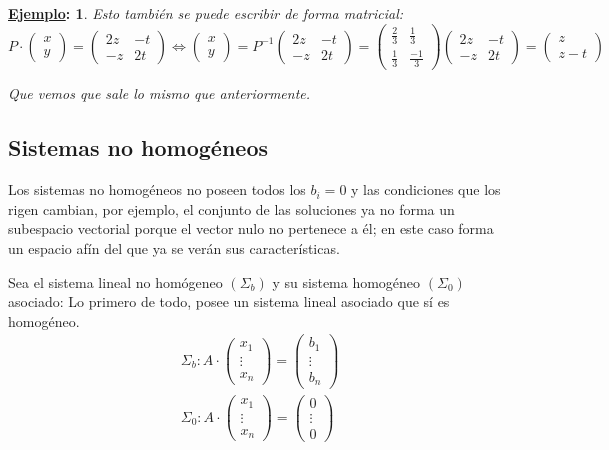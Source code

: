 \documentclass[10pt,a4paper,openright]{book}
\theoremstyle{break}
\newtheorem*{ej}{\underline{Ejemplo}:}
\begin{document}
\begin{ej}
Esto también se puede escribir de forma matricial:
$$P\cdot \begin{pmatrix} x \\ y\end{pmatrix}=\begin{pmatrix} 2z & -t \\ -z & 2t \end{pmatrix}\Leftrightarrow \begin{pmatrix} x \\ y\end{pmatrix}=P^{-1}\begin{pmatrix} 2z & -t \\ -z & 2t \end{pmatrix}= \begin{pmatrix} \frac{2}{3} & \frac{1}{3} \\ \frac{1}{3}& \frac{-1}{3}\end{pmatrix}\begin{pmatrix} 2z & -t \\ -z & 2t \end{pmatrix}= \begin{pmatrix}
z \\ z-t
\end{pmatrix}$$

Que vemos que sale lo mismo que anteriormente.
\end{ej}

\subsection{Sistemas no homogéneos}
Los sistemas no homogéneos no poseen todos los $b_i=0$ y las condiciones que los rigen cambian, por ejemplo, el conjunto de las soluciones ya no forma un subespacio vectorial porque el vector nulo no pertenece a él; en este caso forma un espacio afín del que ya se verán sus características.\par
Sea el sistema lineal no homógeneo $(\Sigma_b)$ y su sistema homogéneo $(\Sigma_0)$ asociado:
Lo primero de todo, posee un sistema lineal asociado que sí es homogéneo.
\begin{gather*}
\Sigma_b: A\cdot \begin{pmatrix}
x_1 \\ \vdots \\ x_n
\end{pmatrix}=\begin{pmatrix}
b_1 \\ \vdots \\ b_n
\end{pmatrix} \\
\Sigma_0: A\cdot \begin{pmatrix}
x_1 \\ \vdots \\ x_n
\end{pmatrix}=\begin{pmatrix}
0 \\ \vdots \\ 0
\end{pmatrix} 
\end{gather*}
\end{document}
